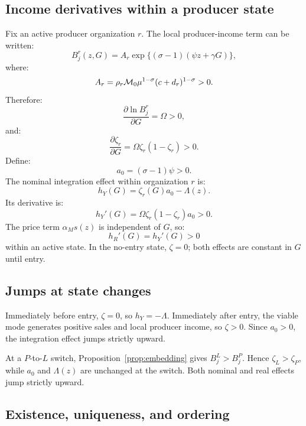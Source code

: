 \subsection{Income derivatives within a producer state}

Fix an active producer organization \(r\).  The local producer-income term can
be written:
\[
B_j^r(z,G)
=
A_r
\exp\{(\sigma-1)(\psi z+\gamma G)\},
\]
where:
\[
A_r
=
\rho_r\mathcal M_0\mu^{1-\sigma}(c+d_r)^{1-\sigma}>0.
\]
Therefore:
\[
\frac{\partial\ln B_j^r}{\partial G}
=\Omega>0,
\]
and:
\[
\frac{\partial\zeta_r}{\partial G}
=
\Omega\zeta_r(1-\zeta_r)>0.
\]
Define:
\[
a_0=(\sigma-1)\psi>0.
\]
The nominal integration effect within organization \(r\) is:
\[
h_Y(G)=\zeta_r(G)a_0-\Lambda(z).
\]
Its derivative is:
\begin{equation}
h_Y'(G)
=
\Omega\zeta_r(1-\zeta_r)a_0>0.
\label{eq:nominal_effect_derivative}
\end{equation}
The price term \(\alpha_Ms(z)\) is independent of \(G\), so:
\[
h_R'(G)=h_Y'(G)>0
\]
within an active state.  In the no-entry state, \(\zeta=0\); both effects
are constant in \(G\) until entry.

\subsection{Jumps at state changes}

Immediately before entry, \(\zeta=0\), so \(h_Y=-\Lambda\).  Immediately
after entry, the viable mode generates positive sales and local producer
income, so \(\zeta>0\).  Since \(a_0>0\), the integration effect jumps
strictly upward.

At a \(P\)-to-\(L\) switch, Proposition~\ref{prop:embedding} gives
\(B_j^L>B_j^P\).  Hence \(\zeta_L>\zeta_P\), while \(a_0\) and
\(\Lambda(z)\) are unchanged at the switch.  Both nominal and real effects
jump strictly upward.

\subsection{Existence, uniqueness, and ordering}

